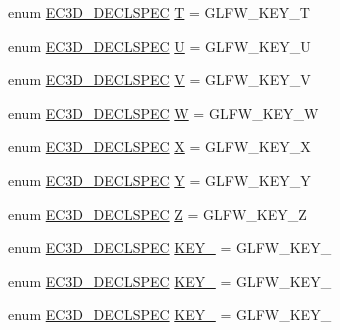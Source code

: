 \begin{DoxyCompactItemize}
\item 
enum \mbox{\hyperlink{_common_8h_aac42573e202ca3dd4d259c81691e2369}{E\+C3\+D\+\_\+\+D\+E\+C\+L\+S\+P\+EC}} \mbox{\hyperlink{classec_1_1_keyboard_a09f863373edf51f09e94316f13dad263}{T}} = G\+L\+F\+W\+\_\+\+K\+E\+Y\+\_\+T
\item 
enum \mbox{\hyperlink{_common_8h_aac42573e202ca3dd4d259c81691e2369}{E\+C3\+D\+\_\+\+D\+E\+C\+L\+S\+P\+EC}} \mbox{\hyperlink{classec_1_1_keyboard_a766e2c870a29b0e0cfdf87346126f9aa}{U}} = G\+L\+F\+W\+\_\+\+K\+E\+Y\+\_\+U
\item 
enum \mbox{\hyperlink{_common_8h_aac42573e202ca3dd4d259c81691e2369}{E\+C3\+D\+\_\+\+D\+E\+C\+L\+S\+P\+EC}} \mbox{\hyperlink{classec_1_1_keyboard_a9b00b29bff502c4e5409b088da7270de}{V}} = G\+L\+F\+W\+\_\+\+K\+E\+Y\+\_\+V
\item 
enum \mbox{\hyperlink{_common_8h_aac42573e202ca3dd4d259c81691e2369}{E\+C3\+D\+\_\+\+D\+E\+C\+L\+S\+P\+EC}} \mbox{\hyperlink{classec_1_1_keyboard_a6b7df6b9d699a9cab8c1283623a12333}{W}} = G\+L\+F\+W\+\_\+\+K\+E\+Y\+\_\+W
\item 
enum \mbox{\hyperlink{_common_8h_aac42573e202ca3dd4d259c81691e2369}{E\+C3\+D\+\_\+\+D\+E\+C\+L\+S\+P\+EC}} \mbox{\hyperlink{classec_1_1_keyboard_a46a9272c629195e29395f7e8d22e7cf5}{X}} = G\+L\+F\+W\+\_\+\+K\+E\+Y\+\_\+X
\item 
enum \mbox{\hyperlink{_common_8h_aac42573e202ca3dd4d259c81691e2369}{E\+C3\+D\+\_\+\+D\+E\+C\+L\+S\+P\+EC}} \mbox{\hyperlink{classec_1_1_keyboard_a3e6065997f9693286591e1300769e13a}{Y}} = G\+L\+F\+W\+\_\+\+K\+E\+Y\+\_\+Y
\item 
enum \mbox{\hyperlink{_common_8h_aac42573e202ca3dd4d259c81691e2369}{E\+C3\+D\+\_\+\+D\+E\+C\+L\+S\+P\+EC}} \mbox{\hyperlink{classec_1_1_keyboard_a342c1ef739e9fd209135017e48f25c58}{Z}} = G\+L\+F\+W\+\_\+\+K\+E\+Y\+\_\+Z
\item 
enum \mbox{\hyperlink{_common_8h_aac42573e202ca3dd4d259c81691e2369}{E\+C3\+D\+\_\+\+D\+E\+C\+L\+S\+P\+EC}} \mbox{\hyperlink{classec_1_1_keyboard_a26913e78a3604aad7a6b33b5d3ba6ad8}{K\+E\+Y\+\_}} = G\+L\+F\+W\+\_\+\+K\+E\+Y\+\_
\item 
enum \mbox{\hyperlink{_common_8h_aac42573e202ca3dd4d259c81691e2369}{E\+C3\+D\+\_\+\+D\+E\+C\+L\+S\+P\+EC}} \mbox{\hyperlink{classec_1_1_keyboard_a0dba45a69958022d4dc07328e803f3e7}{K\+E\+Y\+\_}} = G\+L\+F\+W\+\_\+\+K\+E\+Y\+\_
\item 
enum \mbox{\hyperlink{_common_8h_aac42573e202ca3dd4d259c81691e2369}{E\+C3\+D\+\_\+\+D\+E\+C\+L\+S\+P\+EC}} \mbox{\hyperlink{classec_1_1_keyboard_a99f6daf979b958338ab99f6c4d89dcf0}{K\+E\+Y\+\_}} = G\+L\+F\+W\+\_\+\+K\+E\+Y\+\_

\end{DoxyCompactItemize}
